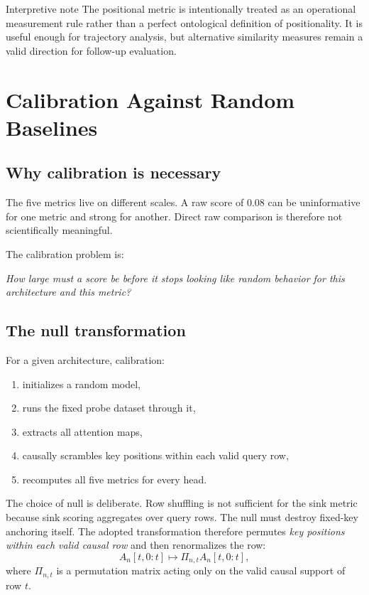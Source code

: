 \documentclass[11pt]{article}
\newcommand{\1}{\mathbf{1}}
\begin{document}
\begin{accentbox}{Interpretive note}
The positional metric is intentionally treated as an operational measurement rule
rather than a perfect ontological definition of positionality. It is useful
enough for trajectory analysis, but alternative similarity measures remain a
valid direction for follow-up evaluation.
\end{accentbox}

\section{Calibration Against Random Baselines}

\subsection{Why calibration is necessary}

The five metrics live on different scales. A raw score of $0.08$ can be
uninformative for one metric and strong for another. Direct raw comparison is
therefore not scientifically meaningful.

The calibration problem is:
\begin{center}
\emph{How large must a score be before it stops looking like random behavior for
this architecture and this metric?}
\end{center}

\subsection{The null transformation}

For a given architecture, calibration:
\begin{enumerate}
\item initializes a random model,
\item runs the fixed probe dataset through it,
\item extracts all attention maps,
\item causally scrambles key positions within each valid query row,
\item recomputes all five metrics for every head.
\end{enumerate}

The choice of null is deliberate. Row shuffling is not sufficient for the sink
metric because sink scoring aggregates over query rows. The null must destroy
fixed-key anchoring itself. The adopted transformation therefore permutes
\emph{key positions within each valid causal row} and then renormalizes the row:
\[
A_n[t,0:t] \mapsto \Pi_{n,t}A_n[t,0:t],
\]
where $\Pi_{n,t}$ is a permutation matrix acting only on the valid causal
support of row $t$.
\end{document}
